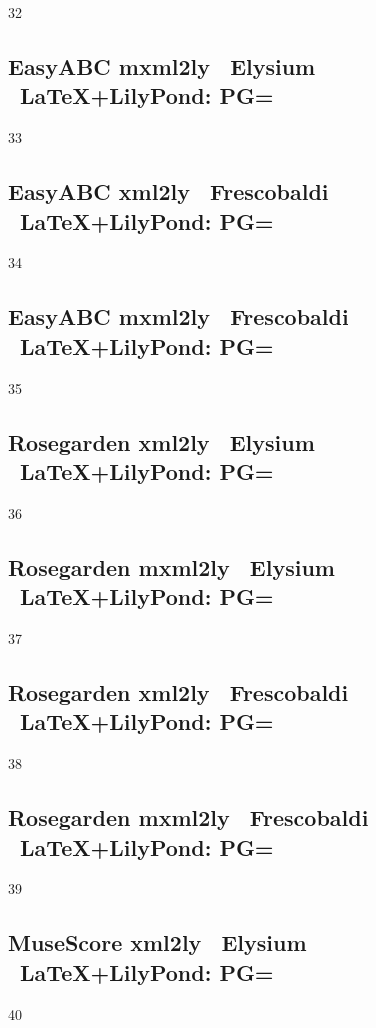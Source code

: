 32

\subsection{Easy\-ABC \ra mxml2ly \ra\ Elysium \ra\ \LaTeX+LilyPond: PG=} 

33

\subsection{Easy\-ABC \ra xml2ly \ra\ Frescobaldi \ra\ \LaTeX+LilyPond: PG=}

34

\subsection{Easy\-ABC \ra mxml2ly \ra\ Frescobaldi \ra\ \LaTeX+LilyPond: PG=} 

35

\subsection{Rosegarden \ra xml2ly \ra\ Elysium \ra\ \LaTeX+LilyPond: PG=}

36

\subsection{Rosegarden \ra mxml2ly \ra\ Elysium \ra\ \LaTeX+LilyPond: PG=}

37

\subsection{Rosegarden \ra xml2ly \ra\ Frescobaldi \ra\ \LaTeX+LilyPond: PG=}

38

\subsection{Rosegarden \ra mxml2ly \ra\ Frescobaldi \ra\ \LaTeX+LilyPond: PG=}

39

\subsection{MuseScore \ra xml2ly \ra\ Elysium \ra\ \LaTeX+LilyPond: PG=}

40

